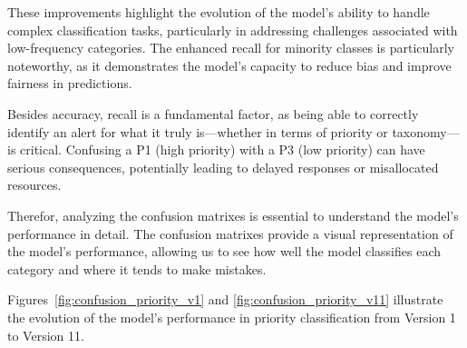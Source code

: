 These improvements highlight the evolution of the model's ability to handle complex classification tasks, particularly in addressing challenges associated with low-frequency categories. 
The enhanced recall for minority classes is particularly noteworthy, as it demonstrates the model's capacity to reduce bias and improve fairness in predictions.

Besides accuracy, recall is a fundamental factor, as being able to correctly identify an alert for what it truly is—whether in terms of priority or taxonomy—is critical. 
Confusing a P1 (high priority) with a P3 (low priority) can have serious consequences, potentially leading to delayed responses or misallocated resources.

Therefor, analyzing the confusion matrixes is essential to understand the model's performance in detail.
The confusion matrixes provide a visual representation of the model's performance, allowing us to see how well the model classifies each category and where it tends to make mistakes.

Figures~\ref{fig:confusion_priority_v1} and \ref{fig:confusion_priority_v11} illustrate the evolution of the model's performance in priority classification from Version 1 to Version 11. 

\clearpage

